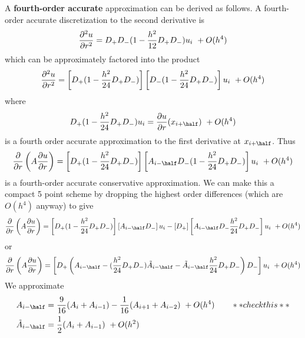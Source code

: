 A {\bf fourth-order accurate} approximation can be derived as follows. A fourth-order
accurate discretization to the second derivative is
\[
   {\partial^2 u \over \partial r^2} = D_+D_- ( 1 - {h^2\over 12} D_+D_- ) u_i ~+O(h^4) 
\]
which can be approximately factored into the product
\[
  {\partial^2 u \over \partial r^2} 
     = \left[ D_+ (1 - {h^2\over 24} D_+D_-) \right] \left[ D_- ( 1 - {h^2\over 24} D_+D_- )\right]u_i  ~+O(h^4)
\]
where
\[
    D_+ (1 - {h^2\over 24} D_+D_- )u_i = {\partial u \over \partial r}(x_{i+\half})~+O(h^4) 
\]
is a fourth order accurate approximation to the first derivative at $x_{i+\half}$.
Thus 
\[
  {\partial\over\partial r}\left( A {\partial u \over \partial r}\right)
   = \left[ D_+ (1 - {h^2\over 24} D_+D_-) \right] 
      \left[ A_{i-\half}D_- ( 1 - {h^2\over 24} D_+D_- )\right]u_i ~+O(h^4) 
\]
is a fourth-order accurate conservative approximation. We can make this a compact 5 point scheme
by dropping the highest order differences (which are $O(h^4)$ anyway) to give
\[
  {\partial\over\partial r}\left( A {\partial u \over \partial r}\right)
   =  \left[ D_+ (1 - {h^2\over 24} D_+D_-) \right]\left[ A_{i-\half}  D_- \right]u_i
     -\left[ D_+\right] \left[ A_{i-\half}D_- {h^2\over 24} D_+D_- \right]u_i  ~+O(h^4)
\]
or 
\[
  {\partial\over\partial r}\left( A {\partial u \over \partial r}\right)
   =  \left[D_+\left( A_{i-\half} - ({h^2\over 24} D_+D_-)\tilde{A}_{i-\half}  
                     - \tilde{A}_{i-\half} {h^2\over 24} D_+D_- \right) D_- \right] u_i  ~+O(h^4)
\]
We approximate
\begin{align*}
   A_{i-\half} & = {9\over 16}(A_i + A_{i-1})-{1\over 16}(A_{i+1} + A_{i-2}) ~+O(h^4)  \qquad **check this** \\
   \tilde{A}_{i-\half} & = {1\over2} (A_i + A_{i-1}) ~+O(h^2)
\end{align*}


